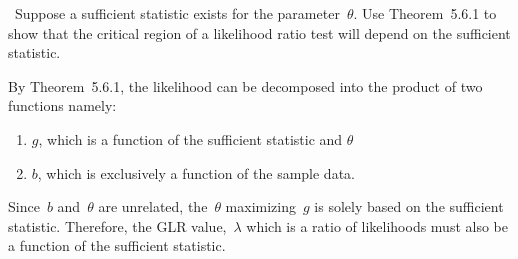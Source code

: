\begin{problem}
  ~Suppose a sufficient statistic exists for the parameter~$\theta$. Use Theorem~5.6.1 to show that the critical region of a likelihood ratio test will depend on the sufficient statistic.
\end{problem}

By Theorem~5.6.1, the likelihood can be decomposed into the product of two functions namely:
\begin{enumerate}
  \item $g$, which is a function of the sufficient statistic and $\theta$
  \item $b$, which is exclusively a function of the sample data.
\end{enumerate}
Since~$b$ and~$\theta$ are unrelated, the~$\theta$ maximizing~$g$ is solely based on the sufficient statistic.  Therefore, the GLR value,~$\lambda$ which is a ratio of likelihoods must also be a function of the sufficient statistic.

